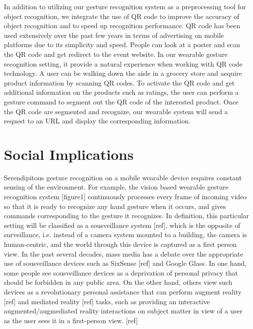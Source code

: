 \documentclass[conference]{IEEEtran}
\begin{document}
In addition to utilizing our gesture recognition system as a preprocessing tool for object recognition, we integrate the use of QR code to improve the accuracy of object recognition and to speed up recognition performance. QR code has been used extensively over the past few years in terms of advertising on mobile platforms due to its simplicity and speed. People can look at a poster and scan the QR code and get redirect to the event website. In our wearable gesture recognition setting, it provide a natural experience when working with QR code technology. A user can be walking down the aisle in a grocery store and acquire product information by scanning QR codes. To activate the QR code and get additional information on the products such as ratings, the user can perform a gesture command to segment out the QR code of the interested product. Once the QR code are segmented and recognize, our wearable system will send a request to an URL and display the corresponding information. 

\section{Social Implications}
Serendipitous gesture recognition on a mobile wearable device requires constant sensing of the environment. For example, the vision based wearable gesture recognition system [figure1] continuously processes every frame of incoming video so that it is ready to recognize any hand gesture when it occurs, and gives commands corresponding to the gesture it recognizes. In definition, this particular setting will be classified as a sousveillance system [ref], which is the opposite of surveillance, i.e. instead of a camera system mounted to a building, the camera is human-centric, and the world through this device is captured as a first person view. In the past several decades, mass media has a debate over the appropriate use of sousveillance devices such as SixSense [ref] and Google Glass. In one hand, some people see sousveillance devices as a deprivation of personal privacy that should be forbidden in any public area. On the other hand, others view such devices as a revolutionary personal assistance that can perform augment reality [ref] and mediated reality [ref] tasks, such as providing an interactive augmented/augmediated reality interactions on subject matter in view of a user as the user sees it in a first-person view. [ref]
\end{document}
